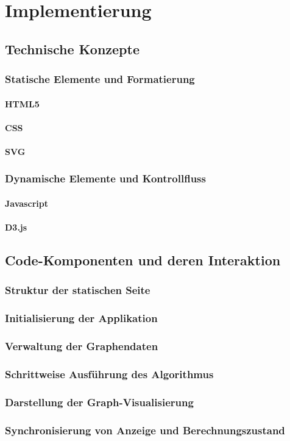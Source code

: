 \chapter{Implementierung}
\section{Technische Konzepte}
\subsection{Statische Elemente und Formatierung}
\subsubsection{HTML5}
\subsubsection{CSS}
\subsubsection{SVG}
\subsection{Dynamische Elemente und Kontrollfluss}
\subsubsection{Javascript}
\subsubsection{D3.js}

\section{Code-Komponenten und deren Interaktion}

\subsection{Struktur der statischen Seite}
\subsection{Initialisierung der Applikation}
\subsection{Verwaltung der Graphendaten}
\subsection{Schrittweise Ausführung des Algorithmus}
\subsection{Darstellung der Graph-Visualisierung}
\subsection{Synchronisierung von Anzeige und Berechnungszustand}